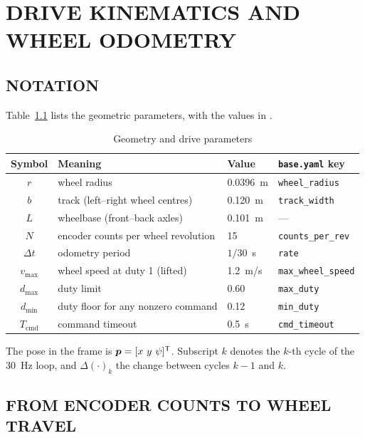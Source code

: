\chapter{DRIVE KINEMATICS AND WHEEL ODOMETRY}
\label{ch:kinematics}

\section{NOTATION}

Table~\ref{tab:geom} lists the geometric parameters, with the values in
.

\begin{table}[htbp]
\centering
\caption{Geometry and drive parameters}
\label{tab:geom}
\small
\begin{tabular}{clll}
\toprule
Symbol & Meaning & Value & \texttt{base.yaml} key \\
\midrule
$r$ & wheel radius & \SI{0.0396}{m} & \texttt{wheel\_radius} \\
$b$ & track (left--right wheel centres) & \SI{0.120}{m} & \texttt{track\_width} \\
$L$ & wheelbase (front--back axles) & \SI{0.101}{m} & --- \\
$N$ & encoder counts per wheel revolution & \num{15} & \texttt{counts\_per\_rev} \\
$\Delta t$ & odometry period & $1/30$~s & \texttt{rate} \\
$v_{\max}$ & wheel speed at duty 1 (lifted) & \SI{1.2}{m/s} & \texttt{max\_wheel\_speed} \\
$d_{\max}$ & duty limit & 0.60 & \texttt{max\_duty} \\
$d_{\min}$ & duty floor for any nonzero command & 0.12 & \texttt{min\_duty} \\
$T_{\mathrm{cmd}}$ & command timeout & \SI{0.5}{s} & \texttt{cmd\_timeout} \\
\bottomrule
\end{tabular}
\end{table}

The pose in the  frame is $\bm{p}=[x\ y\ \psi]\T$. Subscript $k$
denotes the $k$-th cycle of the \SI{30}{Hz} loop, and $\Delta(\cdot)_k$ the
change between cycles $k-1$ and $k$.

\section{FROM ENCODER COUNTS TO WHEEL TRAVEL}

